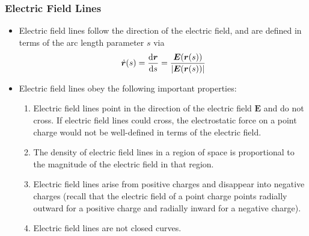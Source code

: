 \documentclass[11pt, a4paper]{article}
\renewcommand{\vec}[1]{\bm{#1}} %
\renewcommand{\r}{\vec{r}}
\newcommand{\E}{\vec{E}} %
\begin{document}
\subsubsection{Electric Field Lines}
\begin{itemize}
    \item Electric field lines follow the direction of the electric field, and are defined in terms of the arc length parameter $ s $ via
    \begin{equation*}
        \dot{\vec{r}}(s) = \dv{\r}{s} = \frac{\E(\r(s))}{\abs{\E(\r(s))}}
    \end{equation*}

    \item Electric field lines obey the following important properties:
    \begin{enumerate}
        \item Electric field lines point in the direction of the electric field $ \E $ and do not cross. If electric field lines could cross, the electrostatic force on a point charge would not be well-defined in terms of the electric field.

        \item The density of electric field lines in a region of space is proportional to the magnitude of the electric field in that region. 

        \item Electric field lines arise from positive charges and disappear into negative charges (recall that the electric field of a point charge points radially outward for a positive charge and radially inward for a negative charge).

        \item Electric field lines are not closed curves.
    \end{enumerate}
\end{itemize}
\end{document}
